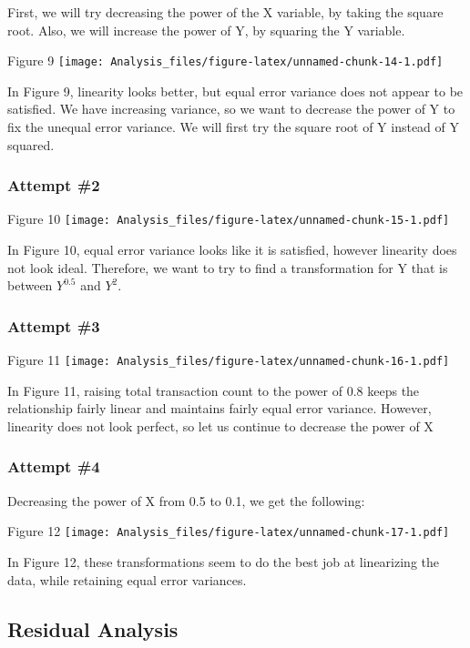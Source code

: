 \documentclass[
]{article}
\begin{document}
First, we will try decreasing the power of the X variable, by taking the
square root. Also, we will increase the power of Y, by squaring the Y
variable.

Figure 9
\texttt{[image: Analysis\_files/figure-latex/unnamed-chunk-14-1.pdf]}

In Figure 9, linearity looks better, but equal error variance does not
appear to be satisfied. We have increasing variance, so we want to
decrease the power of Y to fix the unequal error variance. We will first
try the square root of Y instead of Y squared.

\hypertarget{attempt-2}{%
\subsubsection{Attempt \#2}\label{attempt-2}}

Figure 10
\texttt{[image: Analysis\_files/figure-latex/unnamed-chunk-15-1.pdf]}

In Figure 10, equal error variance looks like it is satisfied, however
linearity does not look ideal. Therefore, we want to try to find a
transformation for Y that is between \(Y^{0.5}\) and \(Y^2\).

\hypertarget{attempt-3}{%
\subsubsection{Attempt \#3}\label{attempt-3}}

Figure 11
\texttt{[image: Analysis\_files/figure-latex/unnamed-chunk-16-1.pdf]}

In Figure 11, raising total transaction count to the power of 0.8 keeps
the relationship fairly linear and maintains fairly equal error
variance. However, linearity does not look perfect, so let us continue
to decrease the power of X

\hypertarget{attempt-4}{%
\subsubsection{Attempt \#4}\label{attempt-4}}

Decreasing the power of X from 0.5 to 0.1, we get the following:

Figure 12
\texttt{[image: Analysis\_files/figure-latex/unnamed-chunk-17-1.pdf]}

In Figure 12, these transformations seem to do the best job at
linearizing the data, while retaining equal error variances.

\hypertarget{residual-analysis}{%
\subsection{Residual Analysis}\label{residual-analysis}}
\end{document}
